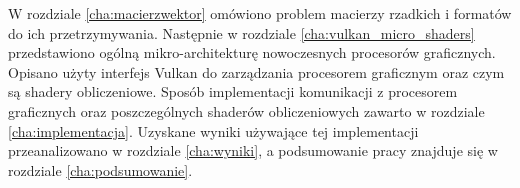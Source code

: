 W rozdziale \ref{cha:macierzwektor} omówiono problem macierzy rzadkich i formatów do ich przetrzymywania.
Następnie w rozdziale \ref{cha:vulkan_micro_shaders} przedstawiono ogólną mikro-architekturę nowoczesnych procesorów graficznych.
Opisano użyty interfejs Vulkan do zarządzania procesorem graficznym oraz czym są shadery obliczeniowe.
Sposób implementacji komunikacji z procesorem graficznych oraz poszczególnych shaderów obliczeniowych zawarto w rozdziale \ref{cha:implementacja}.
Uzyskane wyniki używające tej implementacji przeanalizowano w rozdziale \ref{cha:wyniki}, a podsumowanie pracy znajduje się w rozdziale \ref{cha:podsumowanie}.















